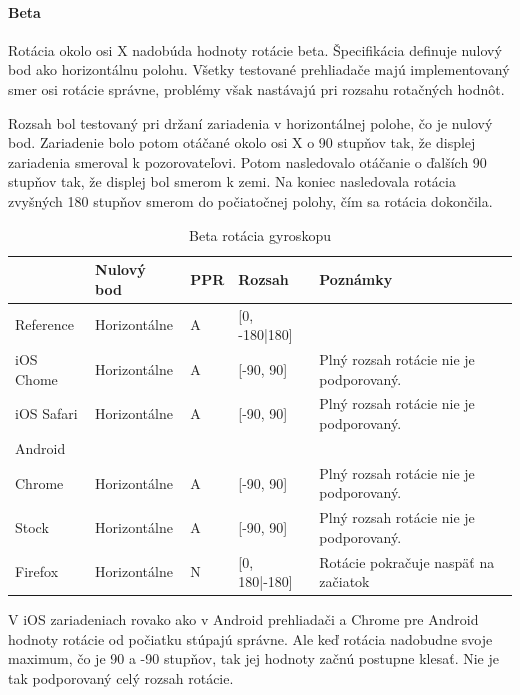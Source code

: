 

\paragraph{Beta} %
\label{par:beta}

Rotácia okolo osi X nadobúda hodnoty rotácie beta. Špecifikácia definuje nulový bod ako horizontálnu polohu. Všetky testované prehliadače majú implementovaný smer osi rotácie správne, problémy však nastávajú pri rozsahu rotačných hodnôt.

Rozsah bol testovaný pri držaní zariadenia v horizontálnej polohe, čo je nulový bod. Zariadenie bolo potom otáčané okolo osi X o 90 stupňov tak, že displej zariadenia smeroval k pozorovateľovi. Potom nasledovalo otáčanie o ďalších 90 stupňov tak, že displej bol smerom k zemi. Na koniec nasledovala rotácia zvyšných 180 stupňov smerom do počiatočnej polohy, čím sa rotácia dokončila.


\begin{table}[H]
  \begin{tabular}{ | l | l | l | l | l |}
  \hline
              & Nulový bod    & PPR   & Rozsah         & Poznámky\\ \hline
  Reference   & Horizontálne   & A     & [0, -180|180] & \\  
  iOS Chome   & Horizontálne   & A     & [-90, 90]     & Plný rozsah rotácie nie je podporovaný. \\  
  iOS Safari  & Horizontálne   & A     & [-90, 90]     & Plný rozsah rotácie nie je podporovaný. \\  
  Android & & & & \\  
  Chrome      & Horizontálne   & A     & [-90, 90]     & Plný rozsah rotácie nie je podporovaný. \\  
  Stock       & Horizontálne   & A     & [-90, 90]     & Plný rozsah rotácie nie je podporovaný. \\  
  Firefox     & Horizontálne   & N     & [0, 180|-180] & Rotácie pokračuje naspäť na začiatok \\
  \hline
  \end{tabular}
  \caption[Beta rotácia gyroskopu]{Beta rotácia gyroskopu}
\end{table}

V iOS zariadeniach rovako ako v Android prehliadači a Chrome pre Android hodnoty rotácie od počiatku stúpajú správne. Ale keď rotácia nadobudne svoje maximum, čo je 90 a -90 stupňov, tak jej hodnoty začnú postupne klesať. Nie je tak podporovaný celý rozsah rotácie.

